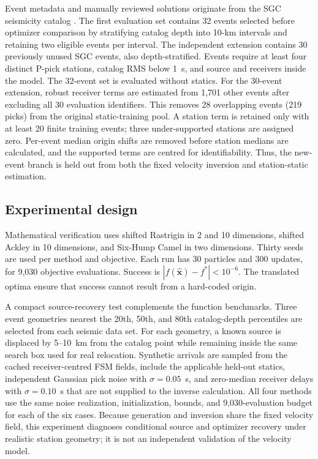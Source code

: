 \documentclass[10pt]{article}
\begin{document}
Event metadata and manually reviewed solutions originate from the SGC seismicity catalog \citep{SGCCatalog}. The first evaluation set contains 32 events selected before optimizer comparison by stratifying catalog depth into 10-km intervals and retaining two eligible events per interval. The independent extension contains 30 previously unused SGC events, also depth-stratified. Events require at least four distinct P-pick stations, catalog RMS below 1~s, and source and receivers inside the model. The 32-event set is evaluated without statics. For the 30-event extension, robust receiver terms are estimated from 1,701 other events after excluding all 30 evaluation identifiers. This removes 28 overlapping events (219 picks) from the original static-training pool. A station term is retained only with at least 20 finite training events; three under-supported stations are assigned zero. Per-event median origin shifts are removed before station medians are calculated, and the supported terms are centred for identifiability. Thus, the new-event branch is held out from both the fixed velocity inversion and station-static estimation.

\subsection{Experimental design}

Mathematical verification uses shifted Rastrigin in 2 and 10 dimensions, shifted Ackley in 10 dimensions, and Six-Hump Camel in two dimensions. Thirty seeds are used per method and objective. Each run has 30 particles and 300 updates, for 9,030 objective evaluations. Success is $|f(\widehat{\bm{x}})-f^*|<10^{-6}$. The translated optima ensure that success cannot result from a hard-coded origin.

A compact source-recovery test complements the function benchmarks. Three event geometries nearest the 20th, 50th, and 80th catalog-depth percentiles are selected from each seismic data set. For each geometry, a known source is displaced by 5--10~km from the catalog point while remaining inside the same search box used for real relocation. Synthetic arrivals are sampled from the cached receiver-centred FSM fields, include the applicable held-out statics, independent Gaussian pick noise with $\sigma=0.05$~s, and zero-median receiver delays with $\sigma=0.10$~s that are not supplied to the inverse calculation. All four methods use the same noise realization, initialization, bounds, and 9,030-evaluation budget for each of the six cases. Because generation and inversion share the fixed velocity field, this experiment diagnoses conditional source and optimizer recovery under realistic station geometry; it is not an independent validation of the velocity model.
\end{document}
